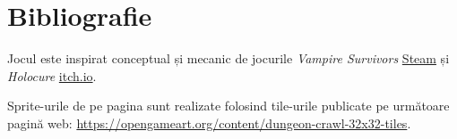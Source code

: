 \documentclass{article}
\begin{document}
    \section*{Bibliografie}
    Jocul este inspirat conceptual și mecanic de jocurile \emph{Vampire Survivors}
    \href{https://store.steampowered.com/app/1794680/Vampire_Survivors/}{Steam} și
    \emph{Holocure} \href{https://kay-yu.itch.io/holocure}{itch.io}.

    Sprite-urile de pe pagina \pageref{sec:sprites} sunt realizate folosind tile-urile publicate
    pe următoare pagină web: \url{https://opengameart.org/content/dungeon-crawl-32x32-tiles}.
\end{document}

